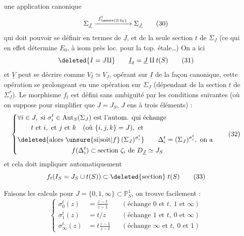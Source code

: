 une application canonique
\[
\Sigma_{\underline J}\xrightarrow{\ f^{t}_{\unsure{2|2_0}}\ }\Sigma_{\underline J}
\tag*{(30)}
\]
qui doit pouvoir se définir en termes de $\underline J$, et de la seule section $t$ de $\Sigma_{\underline J}$ (ce qui en effet détermine $E_0$, à isom  près loc. pour la top. étale\ldots) On a ici
\[
\deleted{I=J\amalg}\qquad \underline I_t=\underline J\amalg t(S)
\tag*{(31)}
\]
et  $\underline V$ peut se décrire comme $V_{\underline I}\simeq V_{\underline J}$, opérant sur $\underline I$ de la façon canonique, cette opération se prolongeant en une opération sur $\Sigma_{\underline J}$ (dépendant de la section $t$ de $\Sigma_{\underline J}^*$). Le  morphisme $f_t$ est défini sans ambiguïté par les conditions suivantes (où on suppose pour simplifier que $\underline J=J_S$, $J$ ens à trois éléments) :
\[
\left\{\begin{aligned}
&\forall i\in J,\ \text{si }\sigma_i^t\in\operatorname{Aut}_S(\Sigma_J)
  \text{ est l'autom. qui échange}\\
&\qquad t\text{ et }i,\text{ et }j\text{ et }k\quad(\text{où }\{i,j,k\}=J),\text{ et}\\
&\deleted{\text{alors }\unsure{\text{si}|\text{soit}|f}\,(\Sigma_J)^{\sigma_i^t}}
  \qquad\Delta_i^t=(\Sigma_J)^{\sigma_i^t},\ \text{on a}\\
&\hspace{8em}f(\Delta_i^t)\subset\text{section }\zeta_i\text{ de }D_{\underline J}\simeq J_S
\end{aligned}\right.
\tag*{(32)}
\]
et cela doit impliquer automatiquement
\[
f_t(I_S=J_S\cup t(S))\subset\deleted{\text{section}}\;t(S)
\tag*{(33)}
\]

Faisons les calculs pour $J=\{0,1,\infty\}\subset\mathbb P^1_S$, on trouve facilement :
\[
\left\{\begin{aligned}
\sigma_0^t(z)&=\frac{z-t}{z-1} &&(\text{échange }0\text{ et }t,\ 1\text{ et }\infty)\\
\sigma_1^t(z)&=t/z &&(\text{échange }1\text{ et }t,\ 0\text{ et }\infty)\\
\sigma_\infty^t(z)&=t\frac{z-1}{z-t} &&(\text{échange }\infty\text{ et }t,\ 0\text{ et }1)
\end{aligned}\right.
\tag*{(34)}
\]

